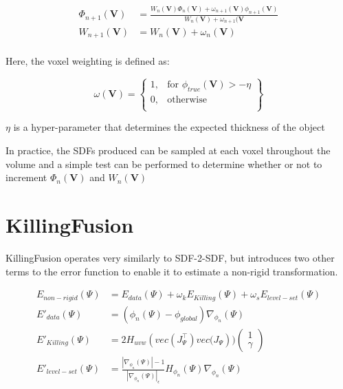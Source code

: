 \documentclass[12pt,twoside]{report}
\begin{document}
\begin{align*}
\Phi_{n+1}(\textbf{V}) &= \frac{W_n(\textbf{V})\Phi_n(\textbf{V}) + \omega_{n+1}(\textbf{V})\phi_{n+1}(\textbf{V})}{W_{n}(\textbf{V}) + \omega_{n+1}(\textbf{V}}\\
W_{n+1}(\textbf{V}) &= W_n(\textbf{V}) + \omega_n(\textbf{V}) \\
\end{align*}

Here, the voxel weighting is defined as:

\[
    \omega(\textbf{V}) = \left\{\begin{array}{lr}
    1, & \text{for } \phi_{true}(\textbf{V}) > - \eta\\
    0, & \text{otherwise}\\
    \end{array}\right\}
\]

$\eta$ is a hyper-parameter that determines the expected thickness of the object 

In practice, the SDFs produced can be sampled at each voxel throughout the volume and a simple test can be performed to determine whether or not to increment $\Phi_n(\textbf{V})$ and $W_n(\textbf{V})$

\section{KillingFusion}

KillingFusion operates very similarly to SDF-2-SDF, but introduces two other terms to the error function to enable it to estimate a non-rigid transformation.

\begin{align*}
E_{non-rigid}(\Psi) &= E_{data}(\Psi) + \omega_kE_{Killing}(\Psi) + \omega_sE_{level-set}(\Psi)\\
E'_{data}(\Psi) &= (\phi_n(\Psi) - \phi_{global}) \nabla_{\phi_n}(\Psi)\\
E'_{Killing}(\Psi) &= 2H_{uvw}(vec(J^{\top}_{\Psi}) vec\big(J_{\Psi})\big)\begin{pmatrix}1\\\gamma \end{pmatrix}\\
E'_{level-set}(\Psi) &= \frac{|\nabla_{\phi_n}(\Psi)| - 1}{|\nabla_{\phi_n}(\Psi)|_\epsilon}H_{\phi_n}(\Psi)\nabla_{\phi_n}(\Psi)
\end{align*}
\end{document}
